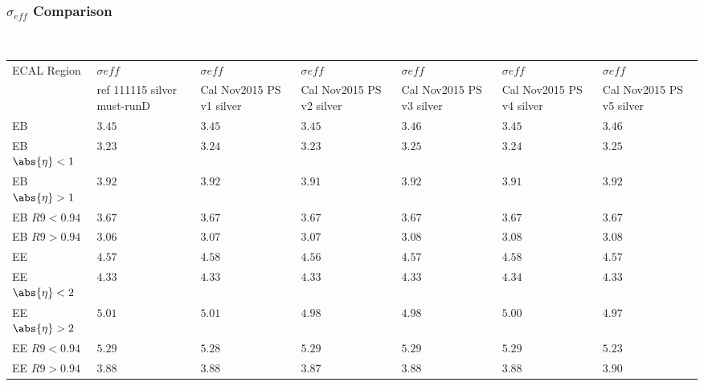 \documentclass[8pt,serif]{beamer}
\begin{document}
\color{titlecolor}
\usebackgroundtemplate{
	\texttt{[image: ]}%
}
\begin{frame}
  \frametitle{$ \sigma_{eff} $ Comparison}
\\


  
  \begin{center}
    \emph{\dataSample}\xspace \invMassVarName

\tiny \begin{tabular}{|l|p{30pt}|p{18pt}|p{18pt}|p{18pt}|p{18pt}|p{18pt}|} \hline  
ECAL Region &  $\sigma {eff}$ &  $\sigma {eff}$ &  $\sigma {eff}$ &  $\sigma {eff}$ &  $\sigma {eff}$ &  $\sigma {eff}$ \\ 
 &  ref 111115 silver must-runD &  Cal Nov2015 PS v1 silver &  Cal Nov2015 PS v2 silver &  Cal Nov2015 PS v3 silver &  Cal Nov2015 PS v4 silver &  Cal Nov2015 PS v5 silver \\ 
\hline           
EB & $3.45$ & $3.45$ & $3.45$ & $3.46$ & $3.45$ & $3.46$ \\
EB $\abs{\eta} < 1$ & $3.23$ & $3.24$ & $3.23$ & $3.25$ & $3.24$ & $3.25$ \\
EB $\abs{\eta} > 1$ & $3.92$ & $3.92$ & $3.91$ & $3.92$ & $3.91$ & $3.92$ \\
EB $R9 < 0.94$ & $3.67$ & $3.67$ & $3.67$ & $3.67$ & $3.67$ & $3.67$ \\
EB $R9 > 0.94$ & $3.06$ & $3.07$ & $3.07$ & $3.08$ & $3.08$ & $3.08$ \\
EE & $4.57$ & $4.58$ & $4.56$ & $4.57$ & $4.58$ & $4.57$ \\
EE $\abs{\eta} < 2$ & $4.33$ & $4.33$ & $4.33$ & $4.33$ & $4.34$ & $4.33$ \\
EE $\abs{\eta} > 2$ & $5.01$ & $5.01$ & $4.98$ & $4.98$ & $5.00$ & $4.97$ \\
EE $R9 < 0.94$ & $5.29$ & $5.28$ & $5.29$ & $5.29$ & $5.29$ & $5.23$ \\
EE $R9 > 0.94$ & $3.88$ & $3.88$ & $3.87$ & $3.88$ & $3.88$ & $3.90$ \\
\hline  
\end{tabular} 
  \end{center}


\end{frame}
\end{document}
